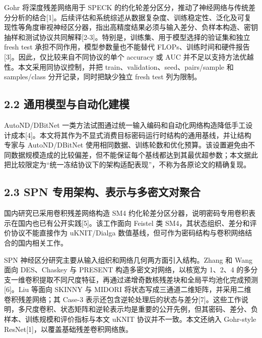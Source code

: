 \documentclass[
  a4paper,
  UTF8]{ctexart}
\begin{document}
Gohr 将深度残差网络用于 SPECK
的约化轮差分区分，推动了神经网络与传统差分分析的结合{[}1{]}。后续评估和系统综述从数据复杂度、训练稳定性、泛化及可复现性等角度审视神经区分器，指出高精度结果必须与输入差分、负样本构造、密钥抽样和测试协议共同解释{[}2-3{]}。特别是，训练集、用于模型选择的验证集和独立
fresh test 承担不同作用，模型参数量也不能替代
FLOPs、训练时间和硬件报告{[}3{]}。因此，仅比较来自不同协议的单个
accuracy 或 AUC 并不足以支持方法优越性。本文采用同协议控制，并把
train、validation、seed、pairs/sample 和 samples/class
分开记录，同时把缺少独立 fresh test 列为限制。

\hypertarget{ux901aux7528ux6a21ux578bux4e0eux81eaux52a8ux5316ux5efaux6a21}{%
\subsection{2.2
通用模型与自动化建模}\label{ux901aux7528ux6a21ux578bux4e0eux81eaux52a8ux5316ux5efaux6a21}}

AutoND/DBitNet
一类方法试图通过统一输入编码和自动化网络构造降低手工设计成本{[}4{]}。本文将其作为不显式消费目标密码运行时结构的通用基线，并让结构专家与
AutoND/DBitNet
使用相同数据、训练轮数和优化预算。该设置避免由不同数据规模造成的比较偏差，但不能保证每个基线都达到其最优超参数；本文据此把比较限定为``统一冻结协议下的架构适配表现''，不称为各原论文的精确复现。

\hypertarget{spn-ux4e13ux7528ux67b6ux6784ux8868ux793aux4e0eux591aux5bc6ux6587ux5bf9ux805aux5408}{%
\subsection{2.3 SPN
专用架构、表示与多密文对聚合}\label{spn-ux4e13ux7528ux67b6ux6784ux8868ux793aux4e0eux591aux5bc6ux6587ux5bf9ux805aux5408}}

国内研究已采用卷积残差网络构造 SM4
约化轮差分区分器，说明密码专用卷积表示在国内也已有公开实践{[}5{]}。该工作面向
Feistel 类 SM4，其状态组织、差分和评价协议不能直接作为 uKNIT/Dialga
数值基线，但可作为密码结构与卷积网络结合的国内相关工作。

SPN 神经区分研究主要从输入组织和网络几何两方面引入结构。Zhang 和 Wang
面向 DES、Chaskey 与 PRESENT 构造多密文对网络，以核宽为 1、2、4
的多分支一维卷积提取不同尺度特征，再通过递增奇数核残差块和全局平均池化完成预测{[}6{]}。Liu
等面向 SKINNY 与 MIDORI
将状态写成三通道二维矩阵，并采用二维卷积残差网络；其 Case-3
表示还包含逆轮处理后的状态与差分{[}7{]}。这些工作说明，多尺度卷积、状态矩阵和逆轮表示均是重要的公开先例，但其密码、差分、负样本、训练规模和评价指标与本文
uKNIT 协议并不一致。本文还纳入 Gohr-style
ResNet{[}1{]}，以覆盖基础残差卷积网络族。
\end{document}
